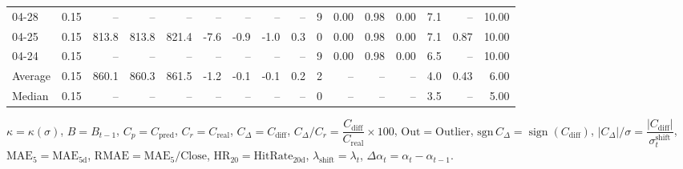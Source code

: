 \begin{threeparttable}
{\begin{tabular}{lrrrrrrrrrrrrrrr}
  04-28 &     0.15 &    -- &    -- &    -- &         -- &             -- &                       -- &                  -- &              9 &       0.00 &      0.98 &           0.00 &              7.1 &              -- &                  10.00 \\
  04-25 &     0.15 & 813.8 & 813.8 & 821.4 &       -7.6 &           -0.9 &                     -1.0 &                 0.3 &              0 &       0.00 &      0.98 &           0.00 &              7.1 &            0.87 &                  10.00 \\
  04-24 &     0.15 &    -- &    -- &    -- &         -- &             -- &                       -- &                  -- &              9 &       0.00 &      0.98 &           0.00 &              6.5 &              -- &                  10.00 \\
Average &     0.15 & 860.1 & 860.3 & 861.5 &       -1.2 &           -0.1 &                     -0.1 &                 0.2 &              2 &         -- &        -- &             -- &              4.0 &            0.43 &                   6.00 \\
 Median &     0.15 &    -- &    -- &    -- &         -- &             -- &                       -- &                  -- &              0 &         -- &        -- &             -- &              3.5 &              -- &                   5.00 \\
\bottomrule
\end{tabular}
}
\begin{tablenotes}\footnotesize
\item $\kappa=\kappa(\sigma)$, $B=B_{t-1}$, $C_p=C_{\text{pred}}$, $C_r=C_{\text{real}}$, $C_\Delta=C_{\text{diff}}$, $C_\Delta/C_r=\dfrac{C_{\text{diff}}}{C_{\text{real}}}\times100$, $\mathrm{Out}=\text{Outlier}$, $\mathrm{sgn}\,C_\Delta=\operatorname{sign}(C_{\text{diff}})$, $|C_\Delta|/\sigma=\dfrac{|C_{\text{diff}}|}{\sigma_t^{\text{shift}}}$, $\mathrm{MAE}_5=\mathrm{MAE}_{5\text{d}}$, $\mathrm{RMAE}= \mathrm{MAE}_5 / \text{Close}$, $\mathrm{HR}_{20}=\mathrm{HitRate}_{20\text{d}}$, 
$\lambda_{\text{shift}}=\lambda_t$, 
$\Delta\alpha_t=\alpha_t-\alpha_{t-1}$.
\end{tablenotes}
\end{threeparttable}
\endgroup

